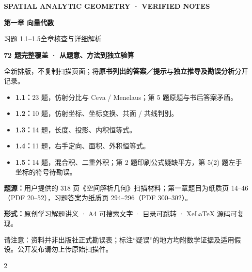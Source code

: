 \documentclass[UTF8,a4paper,11pt,fontset=none]{ctexart}
\begin{document}
\thispagestyle{empty}
\vspace*{17mm}
{\sffamily\large\color{teal}\bfseries SPATIAL ANALYTIC GEOMETRY · VERIFIED NOTES}\par
\vspace{9mm}
{\sffamily\fontsize{29}{38}\selectfont\bfseries\color{navy} 第一章 向量代数}\par
\vspace{4mm}
{\sffamily\fontsize{21}{31}\selectfont\color{blue} 习题 1.1--1.5\enspace 全章核查与详细解析}\par
\vspace{13mm}
\begin{tcolorbox}[colback=light,colframe=rulegray,arc=2mm,boxrule=0.6pt,left=5mm,right=5mm,top=5mm,bottom=5mm]
\large\textbf{72 题完整覆盖 · 从题意、方法到独立验算}\par\medskip
\normalsize
全新排版，不复制扫描页面；将\textbf{原书列出的答案／提示}与\textbf{独立推导及勘误分析}分开记录。
\begin{itemize}
\item \textbf{1.1：}23 题，仿射分比与 Ceva / Menelaus；第 5 题原题与书后答案矛盾。
\item \textbf{1.2：}10 题，仿射坐标、坐标变换、共面 / 共线判别。
\item \textbf{1.3：}14 题，长度、投影、内积恒等式。
\item \textbf{1.4：}11 题，右手定向、面积、外积恒等式。
\item \textbf{1.5：}14 题，混合积、二重外积；第 2 题印刷公式疑缺平方，第 5(2) 题左手坐标的符号待勘误。
\end{itemize}
\end{tcolorbox}
\vfill
{\small\noindent\textbf{题源：}用户提供的 318 页《空间解析几何》扫描材料；第一章题目为纸质页 14--46（PDF 20--52），习题答案为纸质页 294--296（PDF 300--302）。\par}
{\small\noindent\textbf{形式：}原创学习解题讲义 · A4 可搜索文字 · 目录可跳转 · XeLaTeX 源码可复现。\par}
{\footnotesize\color{gray}请注意：资料并非出版社正式勘误表；标注“疑误”的地方均附数学证据及适用假设。公开发布请勿上传原始扫描件。}\par
\clearpage
\begin{multicols}{2}
\footnotesize\setlength{\parskip}{0pt}\tableofcontents
\end{multicols}
\clearpage
\end{document}
